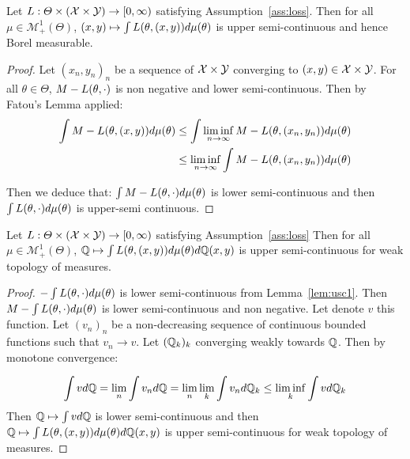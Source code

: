 \begin{lemma}
\label{lem:usc1}
Let $L:\Theta\times(\mathcal{X}\times\mathcal{Y})\rightarrow [0,\infty)$ satisfying Assumption~\ref{ass:loss}.
Then for all $\mu\in\mathcal{M}^1_+(\Theta)$, $(x,y)\mapsto\int L(\theta,(x,y))d\mu(\theta)$ is upper semi-continuous and hence Borel measurable.  
\end{lemma}
\begin{proof}
Let $(x_n,y_n)_n$ be a sequence of $\mathcal{X}\times\mathcal{Y}$ converging to $(x,y)\in\mathcal{X}\times\mathcal{Y}$.  For all $\theta\in\Theta$, $M-L(\theta,\cdot)$ is non negative and lower semi-continuous. Then by Fatou's Lemma applied:
\begin{align*}
   \int M-L(\theta,(x,y))d\mu(\theta)&\leq\int \liminf_{n\to\infty}  M-L(\theta,(x_n,y_n))d\mu(\theta)\\
   &\leq  \liminf_{n\to\infty}  \int M-L(\theta,(x_n,y_n))d\mu(\theta) 
\end{align*}

Then we deduce that: $\int M- L(\theta,\cdot)d\mu(\theta)$ is lower semi-continuous and then $\int L(\theta,\cdot)d\mu(\theta)$ is upper-semi continuous.
\end{proof}


\begin{lemma}
\label{lem:usc2}

Let $L:\Theta\times(\mathcal{X}\times\mathcal{Y})\rightarrow [0,\infty)$ satisfying Assumption~\ref{ass:loss}
Then for all $\mu\in\mathcal{M}^1_+(\Theta)$, $\mathbb{Q}\mapsto\int L(\theta,(x,y))d\mu(\theta)d\mathbb{Q}(x,y)$ is upper semi-continuous for weak topology of measures. 
\end{lemma}
\begin{proof}
 $-\int L(\theta,\cdot)d\mu(\theta) $ is lower semi-continuous from Lemma~\ref{lem:usc1}. Then $M-\int L(\theta,\cdot)d\mu(\theta) $ is lower semi-continuous and non negative. Let denote $v$ this function. Let $(v_n)_n$ be a non-decreasing sequence of continuous bounded functions such that $v_n\to v$. Let $(\mathbb{Q}_k)_k$ converging weakly towards $\mathbb{Q}$. Then by monotone convergence:
 
 \begin{align*}
     \int vd\mathbb{Q} = \lim_n \int v_nd\mathbb{Q} =\lim_n \lim_k\int v_nd\mathbb{Q}_k\leq \liminf_k \int vd\mathbb{Q}_k
 \end{align*}
 Then $\mathbb{Q}\mapsto\int vd\mathbb{Q}$ is lower semi-continuous and then $\mathbb{Q}\mapsto\int L(\theta,(x,y))d\mu(\theta)d\mathbb{Q}(x,y)$ is upper semi-continuous for weak topology of measures. 
 \end{proof}



